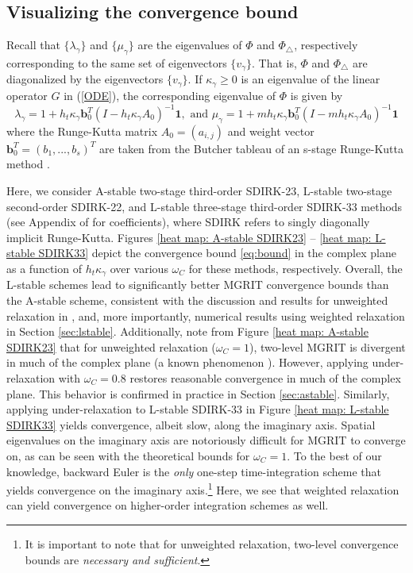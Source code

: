 \documentclass[VANCOUVER,STIX1COL]{WileyNJD-v2}
\begin{document}
\subsection{Visualizing the convergence bound}
\label{sec:verify:vis}

Recall that $\{\lambda_{\gamma}\}$ and $\{\mu_{\gamma}\}$ are the eigenvalues of $\Phi$ and $\Phi_{\triangle}$, respectively corresponding to the same set of eigenvectors $\{v_\gamma\}$. That is, $\Phi$ and $\Phi_{\triangle}$ are diagonalized by the eigenvectors 
$\{v_\gamma\}$.
If $\kappa_{\gamma} \geq 0$ is an eigenvalue of the linear operator $G$ in (\ref{ODE}), the corresponding eigenvalue of $\Phi$ is given by
\begin{equation}
\lambda_\gamma = 1 + h_t \kappa_\gamma \mathbf{b}_0^T (I - h_t \kappa_\gamma A_0)^{-1} \mathbf{1}, \mbox{ and }
\mu_\gamma = 1 + m h_t \kappa_\gamma \mathbf{b}_0^T (I - m h_t \kappa_\gamma A_0)^{-1} \mathbf{1}
\end{equation}
where the Runge-Kutta matrix $A_0 = (a_{i,j})$ and weight vector $\mathbf{b}_0^T = (b_1,...,b_s)^T$ are taken from the Butcher tableau of an s-stage Runge-Kutta method \cite{FrSo2020}.

Here, we consider A-stable two-stage third-order SDIRK-23, L-stable two-stage second-order SDIRK-22, and L-stable three-stage third-order SDIRK-33 methods (see Appendix of \cite{FrSo2020} for coefficients), where SDIRK refers to singly diagonally implicit Runge-Kutta. Figures \ref{heat map: A-stable SDIRK23} -- \ref{heat map: L-stable SDIRK33} depict the convergence bound \eqref{eq:bound} in the complex plane as a function of $h_t \kappa_\gamma$ over various $\omega_C$ for these methods, respectively. Overall, the L-stable schemes lead to significantly better MGRIT convergence bounds than the A-stable scheme, consistent with the discussion and results for unweighted relaxation in \cite{FrSo2020}, and, more importantly, numerical results using weighted relaxation in Section
\ref{sec:lstable}. Additionally, note from Figure \ref{heat map: A-stable SDIRK23} that for unweighted relaxation ($\omega_C =1$), two-level MGRIT is divergent in much of the complex plane (a known phenomenon \cite{FrSo2020}). However, applying under-relaxation with $\omega_C = 0.8$ restores reasonable convergence in much of the complex plane. This behavior is confirmed in practice in Section \ref{sec:astable}. Similarly, applying under-relaxation to L-stable SDIRK-33 in Figure \ref{heat map: L-stable SDIRK33} yields convergence, albeit slow, along the imaginary axis. Spatial eigenvalues on the imaginary axis are notoriously difficult for MGRIT to converge on, as can be seen with the theoretical bounds for $\omega_C=1$. To the best of our knowledge, backward Euler is the \emph{only} one-step time-integration scheme that yields convergence on the imaginary axis.\footnote{It is important to note that for unweighted relaxation, two-level convergence bounds are \emph{necessary and sufficient}\cite{So2019}.} Here, we see that weighted relaxation can yield convergence on higher-order integration schemes as well.
\end{document}

